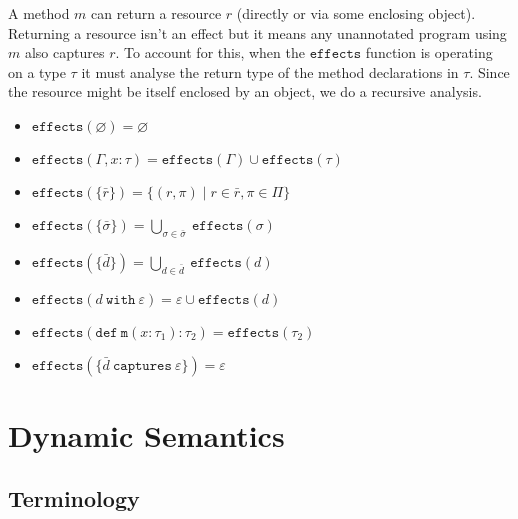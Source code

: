 \documentclass{llncs}
\newcommand{\keywadj}[1]{\mathtt{#1}}
\newcommand{\keyw}[1]{\keywadj{#1}~}
\begin{document}
\noindent
A method $m$ can return a resource $r$ (directly or via some enclosing object). Returning a resource isn't an effect but it means any unannotated program using $m$ also captures $r$. To account for this, when the $\keywadj{effects}$ function is operating on a type $\tau$ it must analyse the return type of the method declarations in $\tau$. Since the resource might be itself enclosed by an object, we do a recursive analysis.

\begin{itemize}
	\item $\keywadj{effects}(\varnothing) = \varnothing$
	\item $\keywadj{effects}(\Gamma, x : \tau) = \keywadj{effects}(\Gamma) \cup \keywadj{effects}(\tau)$
	\item $\keywadj{effects}(\{\bar r\}) = \{ (r, \pi) \mid r \in \bar r, \pi \in \Pi \}$
	\item $\keywadj{effects}(\{\bar \sigma\}) = \bigcup_{\sigma \in \bar \sigma}~\keywadj{effects}(\sigma)$
	\item $\keywadj{effects}(\{\bar d\}) = \bigcup_{d \in \bar d}~\keywadj{effects}(d)$
	\item $\keywadj{effects}(d~\keyw{with} \varepsilon) = \varepsilon \cup \keywadj{effects}(d)$
	\item $\keywadj{effects}(\keywadj{def~m}(x : \tau_1) : \tau_2) = \keywadj{effects}(\tau_2)$
	\item $\keywadj{effects}(\{  \bar d~\keyw{captures} \varepsilon\}) = \varepsilon$
\end{itemize}

\newpage


\section{Dynamic Semantics}

\subsection{Terminology}
\end{document}
